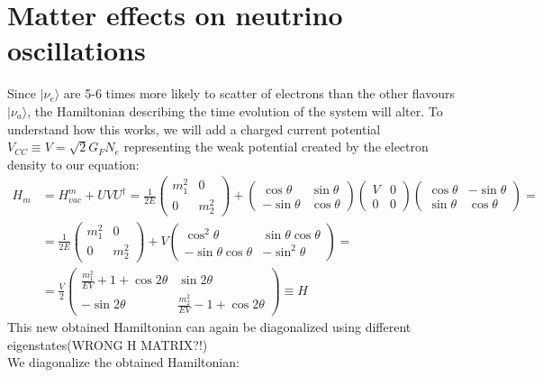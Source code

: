 \documentclass[a4paper,12pt]{article}
\begin{document}
\section{Matter effects on neutrino oscillations}
Since $|\nu_e\rangle$ are 5-6 times more likely to scatter of electrons than the other flavours $|\nu_a\rangle$, the Hamiltonian describing the time evolution of the system will alter. To understand how this works, we will add a charged current potential $V_{CC}\equiv V=\sqrt{2}G_FN_e$ representing the weak potential created by the electron density to our equation:
\begin{align*}
H_m&=H_{vac}^m+UVU^\dagger=\frac{1}{2E}\begin{pmatrix}
m_1^2&0\\ 0&m_2^2
\end{pmatrix}+\begin{pmatrix}
\cos\theta &\sin\theta\\ -\sin\theta &\cos\theta
\end{pmatrix}\begin{pmatrix}
V&0\\ 0&0
\end{pmatrix}\begin{pmatrix}
\cos\theta &-\sin\theta \\ \sin\theta &\cos\theta 
\end{pmatrix}=\\
&=\frac{1}{2E}\begin{pmatrix}
m_1^2&0\\ 0&m_2^2
\end{pmatrix}+V\begin{pmatrix}
\cos^2\theta &\sin\theta\cos\theta\\ -\sin\theta\cos\theta &-\sin^2\theta
\end{pmatrix}=\\
&=\frac{V}{2}\begin{pmatrix}
\frac{m_1^2}{EV}+1+\cos 2\theta &\sin 2\theta\\ -\sin 2\theta &\frac{m_2^2}{EV}-1+\cos 2\theta
\end{pmatrix}\equiv H
\end{align*}
This new obtained Hamiltonian can again be diagonalized using different eigenstates(WRONG H MATRIX?!)
\\
We diagonalize the obtained Hamiltonian:
\end{document}

